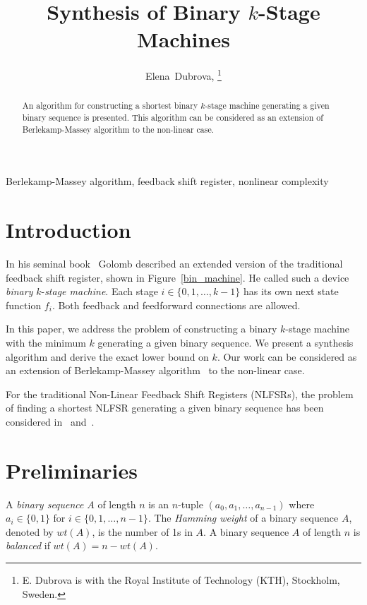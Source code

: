 \documentclass[twocolumn]{IEEEtran} \usepackage{epsfig}
\begin{document}
\title{Synthesis of Binary $k$-Stage Machines} 
\author{Elena~Dubrova, \thanks{E. Dubrova is with the Royal Institute of Technology (KTH), Stockholm, Sweden.}}

\maketitle

\begin{abstract}
An algorithm for constructing a shortest binary $k$-stage machine 
generating a given binary sequence is presented. This algorithm 
can be considered as an extension of Berlekamp-Massey algorithm to the non-linear case. 
\end{abstract}


\begin{keywords}
Berlekamp-Massey algorithm, feedback shift register, nonlinear complexity
\end{keywords}

\section{Introduction}

In his seminal book~\cite{Golomb_book} Golomb described an extended version of the traditional
feedback shift register, shown in Figure~\ref{bin_machine}. He called such a device {\em binary}
$k$-{\em stage machine}. Each stage $i \in \{0,1,\ldots,k-1\}$ has its own next state function $f_i$.
Both feedback and feedforward connections are allowed.  

In this paper, we address the problem of constructing a binary
$k$-stage machine with the minimum $k$ generating a given
binary sequence. We present a synthesis algorithm and derive the exact lower bound on
$k$. Our work can be considered as an extension of Berlekamp-Massey
algorithm~\cite{Ma69} to the non-linear case. 


For the traditional Non-Linear Feedback Shift Registers (NLFSRs), 
the problem of finding a shortest NLFSR generating a
given binary sequence has been considered in~\cite{Ja91,RiK05,RiKK05}
and~\cite{LiKK07}.  

\section{Preliminaries} 

A {\em binary sequence} $A$ of length $n$ is an $n$-tuple $(a_0, a_1, \ldots, a_{n-1})$
where $a_i \in \{0,1\}$ for $i \in \{0,1,\ldots,n-1\}$. The {\em Hamming weight} of a binary sequence $A$,
denoted by  $wt(A)$,  is the number of 1s in $A$. A binary sequence $A$ of length $n$ is  {\em balanced}
if $wt(A) = n-wt(A)$.
\end{document}
